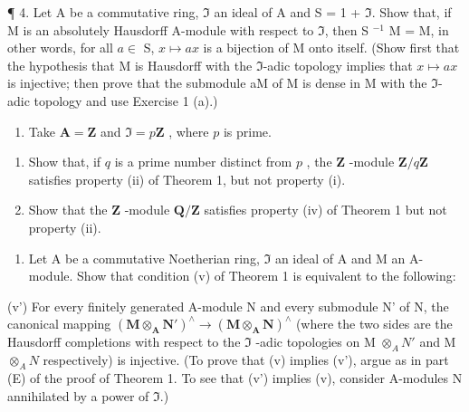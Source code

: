 ¶ 4. Let A be a commutative ring, \(\mathfrak{I}\) an ideal of A and S = 1 + \(\mathfrak{I}\). Show that, if M is an absolutely Hausdorff A-module with respect to \(\mathfrak{I}\), then S \(^{-1}\) M = M, in other words, for all \(a \in\) S, \(x \mapsto ax\) is a bijection of M onto itself. (Show first that the hypothesis that M is Hausdorff with the \(\mathfrak{I}\)-adic topology implies that \(x \mapsto ax\) is injective; then prove that the submodule aM of M is dense in M with the \(\mathfrak{I}\)-adic topology and use Exercise 1 (a).)

\begin{enumerate}
\def\labelenumi{\arabic{enumi}.}
\setcounter{enumi}{4}
\tightlist
\item
  Take \(\mathbf{A} = \mathbf{Z}\) and \(\mathfrak{I} = p\mathbf{Z}\) , where \(p\) is prime.
\end{enumerate}

\begin{enumerate}
\def\labelenumi{(\alph{enumi})}
\item
  Show that, if \(q\) is a prime number distinct from \(p\) , the \(\mathbf{Z}\) -module \(\mathbf{Z} / q\mathbf{Z}\) satisfies property (ii) of Theorem 1, but not property (i).
\item
  Show that the \(\mathbf{Z}\) -module \(\mathbf{Q} / \mathbf{Z}\) satisfies property (iv) of Theorem 1 but not property (ii).
\end{enumerate}

\begin{enumerate}
\def\labelenumi{\arabic{enumi}.}
\setcounter{enumi}{5}
\tightlist
\item
  Let A be a commutative Noetherian ring, \(\mathfrak{I}\) an ideal of A and M an A-module. Show that condition (v) of Theorem 1 is equivalent to the following:
\end{enumerate}

(v') For every finitely generated A-module N and every submodule N' of N, the canonical mapping \((\mathbf{M} \otimes_{\mathbf{A}} \mathbf{N}')^{\wedge} \to (\mathbf{M} \otimes_{\mathbf{A}} \mathbf{N})^{\wedge}\) (where the two sides are the Hausdorff completions with respect to the \(\mathfrak{I}\) -adic topologies on M \(\otimes_{A} N'\) and M \(\otimes_{A} N\) respectively) is injective. (To prove that (v) implies (v'), argue as in part (E) of the proof of Theorem 1. To see that (v') implies (v), consider A-modules N annihilated by a power of \(\mathfrak{I}\).)

